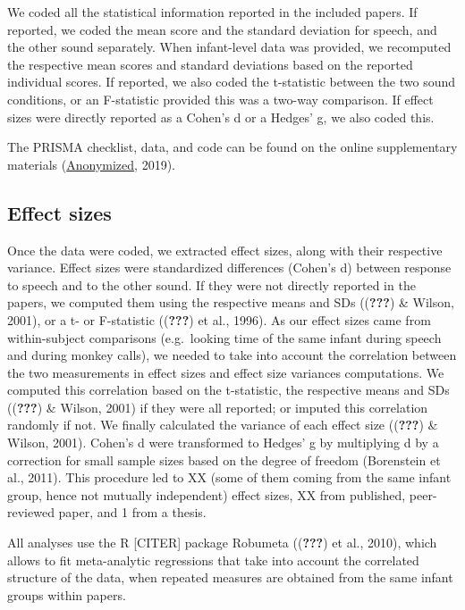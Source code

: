 \documentclass[man]{apa6}
\begin{document}
We coded all the statistical information reported in the included
papers. If reported, we coded the mean score and the standard deviation
for speech, and the other sound separately. When infant-level data was
provided, we recomputed the respective mean scores and standard
deviations based on the reported individual scores. If reported, we also
coded the t-statistic between the two sound conditions, or an
F-statistic provided this was a two-way comparison. If effect sizes were
directly reported as a Cohen's d or a Hedges' g, we also coded this.

The PRISMA checklist, data, and code can be found on the online
supplementary materials
(\href{https://osf.io/4stz9/?view_only=d0696591ebf34bfc8430f848cd945ca8}{Anonymized},
2019).

\subsection{Effect sizes}\label{effect-sizes}

Once the data were coded, we extracted effect sizes, along with their
respective variance. Effect sizes were standardized differences (Cohen's
d) between response to speech and to the other sound. If they were not
directly reported in the papers, we computed them using the respective
means and SDs (({\textbf{???}}) \& Wilson, 2001), or a t- or F-statistic
(({\textbf{???}}) et al., 1996). As our effect sizes came from
within-subject comparisons (e.g.~looking time of the same infant during
speech and during monkey calls), we needed to take into account the
correlation between the two measurements in effect sizes and effect size
variances computations. We computed this correlation based on the
t-statistic, the respective means and SDs (({\textbf{???}}) \& Wilson,
2001) if they were all reported; or imputed this correlation randomly if
not. We finally calculated the variance of each effect size
(({\textbf{???}}) \& Wilson, 2001). Cohen's d were transformed to
Hedges' g by multiplying d by a correction for small sample sizes based
on the degree of freedom (Borenstein et al., 2011). This procedure led
to XX (some of them coming from the same infant group, hence not
mutually independent) effect sizes, XX from published, peer-reviewed
paper, and 1 from a thesis.

All analyses use the R {[}CITER{]} package Robumeta (({\textbf{???}}) et
al., 2010), which allows to fit meta-analytic regressions that take into
account the correlated structure of the data, when repeated measures are
obtained from the same infant groups within papers.
\end{document}
